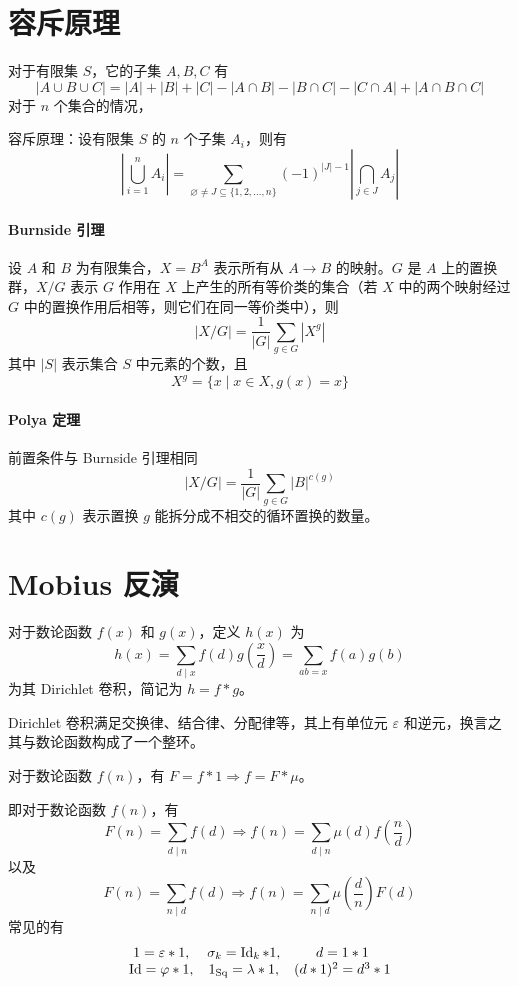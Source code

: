 \documentclass{pureart}
\begin{document}
\section{容斥原理}

对于有限集 $S$，它的子集 $A,B,C$ 有
\[ |A \cup B \cup C| = |A| + |B| + |C| - |A\cap B| - |B \cap C| - |C \cap A| + |A \cap B \cap C| \]
对于 $n$ 个集合的情况，

容斥原理：设有限集 $S$ 的 $n$ 个子集 $A_i$，则有
\[ \left|\bigcup _{i=1}^{n}A_{i}\right|=\sum _{\varnothing \neq J\subseteq \{1,2,\ldots ,n\}}(-1)^{|J|-1}\left| \bigcap _{j\in J}A_{j} \right| \]

\paragraph{Burnside 引理}
设 $A$ 和 $B$ 为有限集合，$X=B^A$ 表示所有从 $A \to B$ 的映射。$G$ 是 $A$ 上的置换群，$X/G$ 表示 $G$ 作用在 $X$ 上产生的所有等价类的集合（若 $X$ 中的两个映射经过 $G$ 中的置换作用后相等，则它们在同一等价类中），则
\[ |X/G|=\frac{1}{|G|}\sum_{g\in G}|X^g| \]
其中 $|S|$ 表示集合 $S$ 中元素的个数，且
\[ X^g = \{ x \mid x \in X,g(x) = x \} \]

\paragraph{Polya 定理}
前置条件与 Burnside 引理相同
\[ |X/G|=\frac{1}{|G|}\sum_{g\in G}|B|^{c(g)} \]
其中 $c(g)$ 表示置换 $g$ 能拆分成不相交的循环置换的数量。


\section{Mobius 反演}

对于数论函数 $f(x)$ 和 $g(x)$，定义 $h(x)$ 为
\[ h(x) = \sum_{d \mid x} f(d) g\left(\frac{x}{d}\right) = \sum_{ab = x} f(a)g(b) \]
为其 Dirichlet 卷积，简记为 $h = f \ast g$。

Dirichlet 卷积满足交换律、结合律、分配律等，其上有单位元 $\varepsilon$ 和逆元，换言之其与数论函数构成了一个整环。

对于数论函数 $f(n)$，有 $F = f \ast 1 \Rightarrow f = F \ast \mu$。

即对于数论函数 $f(n)$，有
\[ F(n) = \sum_{d \mid n} f(d) \Rightarrow f(n) = \sum_{d \mid n} \mu(d)f\left(\frac{n}{d}\right) \]
以及
\[ F(n) = \sum_{n \mid d} f(d) \Rightarrow f(n) = \sum_{n \mid d} \mu\left(\frac{d}{n}\right)F(d) \]
常见的有
\[ \begin{matrix}
    1 = \varepsilon \ast 1, & \sigma_k = \operatorname{Id}_k \ast 1,& d = 1 \ast 1 \\
    \operatorname{Id} = \varphi \ast 1, & 1_{\operatorname{Sq}} = \lambda \ast 1, &(d \ast 1)^2 = d^3 \ast 1
\end{matrix} \]
\end{document}

